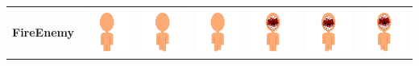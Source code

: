 \documentclass[../Main.tex]{subfiles}
\begin{document}
\begin{center}
\begin{tabular}{ | m{} | m{} m{} m{} m{} m{} m{} | }
                    \multirow{2}{*}{\textbf{FireEnemy}} & \centerline{\includegraphics[scale=3]{../res/textures/entities/enemies/fire/North.png}} & \centerline{\includegraphics[scale=3]{../res/textures/entities/enemies/fire/North-Walk-1.png}} & \centerline{\includegraphics[scale=3]{../res/textures/entities/enemies/fire/North-Walk-2.png}} & \centerline{\includegraphics[scale=3]{../res/textures/entities/enemies/fire/South.png}} & \centerline{\includegraphics[scale=3]{../res/textures/entities/enemies/fire/South-Walk-1.png}} & \centerline{\includegraphics[scale=3]{../res/textures/entities/enemies/fire/South-Walk-2.png}} \\

\end{tabular}
\end{center}
\end{document}
